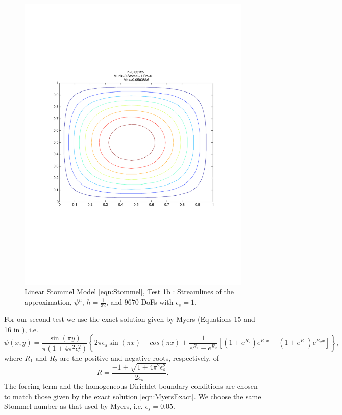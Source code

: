 \begin{figure}[H]
  \begin{center}
    \includegraphics[trim=0 200 20 220, clip=true, scale=0.5]{StommelVallise1.pdf}
    \caption{Linear Stommel Model \eqref{eqn:Stommel}, Test 1b \cite{Vallis06}: Streamlines of the approximation,
    $\psi^h$, $h=\frac{1}{32}$, and $9670$ DoFs with $\epsilon_s=1$.}
    \label{fig:StommelVallise1}
  \end{center}
\end{figure}

For our second test we use the exact solution given by Myers (Equations 15 and 16 in \cite{Myers}), i.e.
{\footnotesize
\begin{equation}
  \psi(x,y) =\frac{\sin(\pi y)}{\pi(1+4\pi^2\epsilon_s^2)}\left\{2\pi\epsilon_s\sin(\pi x)+cos(\pi x)+\frac{1}{e^{R_1}-e^{R_2}}\left[(1+e^{R_2})e^{R_1x}-(1+e^{R_1})e^{R_2x}\right]\right\},
  \label{eqn:MyersExact}
\end{equation}
}
where $R_1\text{ and } R_2$ are the positive and negative roots, respectively, of 
\begin{equation*}
  R = \frac{-1\pm\sqrt{1+4\pi^2 \epsilon_s^2}}{2\epsilon_s}.
\end{equation*}
The forcing term and the homogeneous Dirichlet boundary conditions are chosen to match those given
by the exact solution \eqref{eqn:MyersExact}. We choose the same Stommel number as that used by
Myers, i.e. $\epsilon_s=0.05$.

